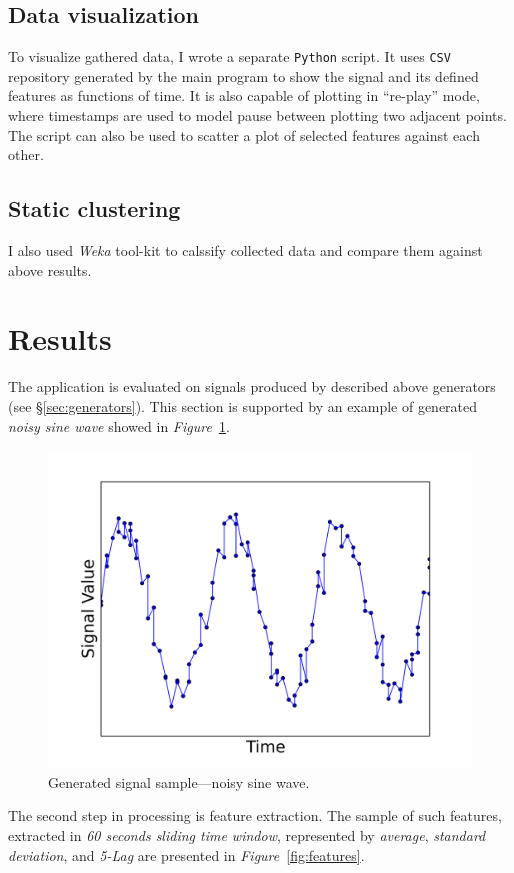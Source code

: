\documentclass[11pt, letterpaper]{article}            %
\begin{document}
\subsection{Data visualization}
To visualize gathered data, I wrote a separate \texttt{Python} script. It uses \texttt{CSV} repository generated by the main program to show the signal and its defined features as functions of time. It is also capable of plotting in ``re-play'' mode, where timestamps are used to model pause between plotting two adjacent points.\\
The script can also be used to scatter a plot of selected features against each other.\\

\subsection{Static clustering}
I also used \emph{Weka} tool-kit to calssify collected data and compare them against above results.


\section{Results}
The application is evaluated on signals produced by described above generators (see §\ref{sec:generators}). This section is supported by an example of generated \emph{noisy sine wave} showed in \emph{Figure}~\ref{fig:signal}.\\

\begin{figure}[htbp]
  \centering
  \includegraphics[width=.7\textwidth]{./gfx/feature5.png}
  \caption{Generated signal sample---noisy sine wave.\label{fig:signal}}
\end{figure}

The second step in processing is feature extraction. The sample of such features, extracted in \emph{60 seconds sliding time window}, represented by \emph{average}, \emph{standard deviation}, and \emph{5-Lag} are presented in \emph{Figure}~\ref{fig:features}.\\
\end{document}
